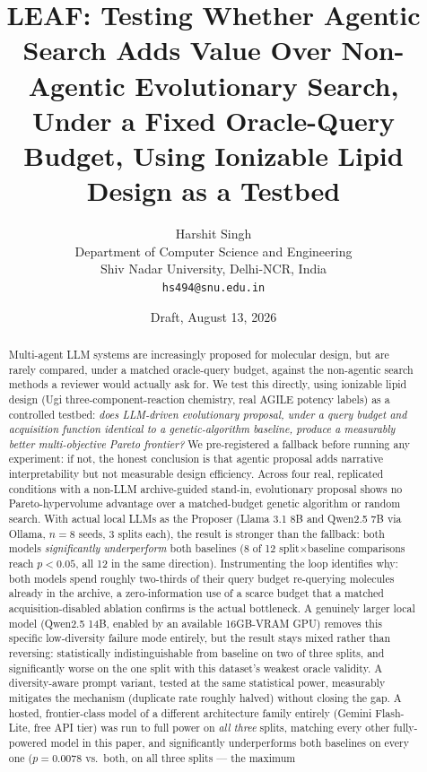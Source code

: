 \documentclass{article}
\title{LEAF: Testing Whether Agentic Search Adds Value Over Non-Agentic
Evolutionary Search, Under a Fixed Oracle-Query Budget, Using Ionizable
Lipid Design as a Testbed}
\author{Harshit Singh \\ Department of Computer Science and Engineering \\
Shiv Nadar University, Delhi-NCR, India \\ \texttt{hs494@snu.edu.in}}
\date{Draft, August 13, 2026}
\begin{document}
\maketitle

\begin{abstract}
Multi-agent LLM systems are increasingly proposed for molecular design,
but are rarely compared, under a matched oracle-query budget, against the
non-agentic search methods a reviewer would actually ask for. We test this
directly, using ionizable lipid design (Ugi three-component-reaction
chemistry, real AGILE potency labels) as a controlled testbed: \emph{does
LLM-driven evolutionary proposal, under a query budget and acquisition
function identical to a genetic-algorithm baseline, produce a measurably
better multi-objective Pareto frontier?} We pre-registered a fallback
before running any experiment: if not, the honest conclusion is that
agentic proposal adds narrative interpretability but not measurable design
efficiency. Across four real, replicated conditions with a non-LLM
archive-guided stand-in, evolutionary proposal shows no Pareto-hypervolume
advantage over a matched-budget genetic algorithm or random search. With
actual local LLMs as the Proposer (Llama 3.1 8B and Qwen2.5 7B via Ollama,
$n=8$ seeds, 3 splits each), the result is stronger than the fallback: both
models \emph{significantly underperform} both baselines (8 of 12
split$\times$baseline comparisons reach $p<0.05$, all 12 in the same
direction). Instrumenting the loop identifies why: both models spend
roughly two-thirds of their query budget re-querying molecules already in
the archive, a zero-information use of a scarce budget that a matched
acquisition-disabled ablation confirms is the actual bottleneck. A
genuinely larger local model (Qwen2.5 14B, enabled by an available
16GB-VRAM GPU) removes this specific low-diversity failure mode entirely,
but the result stays mixed rather than reversing: statistically
indistinguishable from baseline on two of three splits, and significantly
worse on the one split with this dataset's weakest oracle validity. A
diversity-aware prompt variant, tested at the same statistical power,
measurably mitigates the mechanism (duplicate rate roughly halved) without
closing the gap. A hosted, frontier-class model of a different
architecture family entirely (Gemini Flash-Lite, free API tier) was run
to full power on \emph{all three} splits, matching every other fully-powered
model in this paper, and significantly underperforms both baselines on
every one ($p=0.0078$ vs.\ both, on all three splits --- the maximum

\end{abstract}
\end{document}

